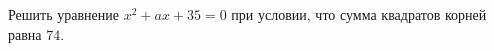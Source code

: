\begin{ex}
	\begin{condition}
		Решить уравнение \( x^2+ax+35=0 \) при условии, что сумма квадратов корней равна \( 74 \).
	\end{condition}
\end{ex}